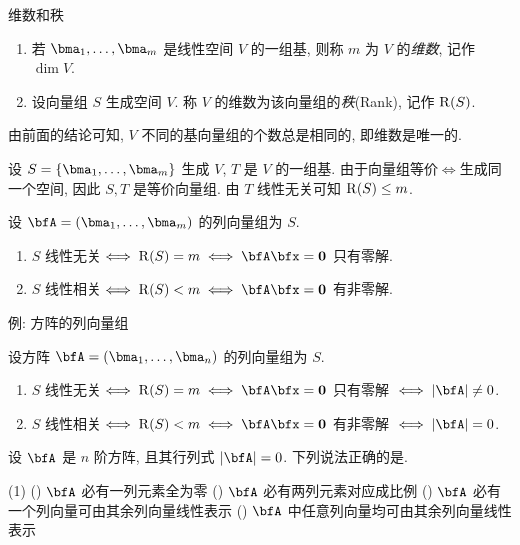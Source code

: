 \begin{frame}{维数和秩}
	\onslide<+->
	\begin{definition}
		\begin{enumerate}
			\item 若 $\bma_1,\dots,\bma_m$ 是线性空间 $V$ 的一组基, 则称 $m$ 为 $V$ 的\emph{维数}, 记作 $\dim V$.
			\item 设向量组 $S$ 生成空间 $V$.
			称 $V$ 的维数为该向量组的\emph{秩}(Rank), 记作 $\operatorname{R}(S)$.
		\end{enumerate}
	\end{definition}
	\onslide<+->
	由前面的结论可知, $V$ 不同的基向量组的个数总是相同的, 即维数是唯一的.

	\onslide<+->
	设 $S=\{\bma_1,\dots,\bma_m\}$ 生成 $V$,
	\onslide<+->
	$T$ 是 $V$ 的一组基.
	\onslide<+->
	由于向量组等价$\iff$生成同一个空间, 因此 $S,T$ 是等价向量组.
	\onslide<+->
	由 $T$ 线性无关可知 $\operatorname{R}(S)\le m$.
	\onslide<+->
	\begin{theorem}
		设 $\bfA=(\bma_1,\dots,\bma_m)$ 的列向量组为 $S$.
		\begin{enumerate}
			\item $S$ 线性无关$\iff \rank(S)=m\iff\bfA\bfx={\bf0}$ 只有零解.
			\item $S$ 线性相关$\iff \rank(S)<m\iff\bfA\bfx={\bf0}$ 有非零解.
		\end{enumerate}
	\end{theorem}
\end{frame}


\begin{frame}{例: 方阵的列向量组}
	\onslide<+->
	\begin{corollary}
		设方阵 $\bfA=(\bma_1,\dots,\bma_n)$ 的列向量组为 $S$.
		\begin{enumerate}
			\item $S$ 线性无关$\iff \rank(S)=m\iff\bfA\bfx={\bf0}$ 只有零解 $\iff |\bfA|\neq0$.
			\item $S$ 线性相关$\iff \rank(S)<m\iff\bfA\bfx={\bf0}$ 有非零解 $\iff |\bfA|=0$.
		\end{enumerate}
	\end{corollary}
	\onslide<+->
	\begin{exercise}
		设 $\bfA$ 是 $n$ 阶方阵, 且其行列式 $|\bfA|=0$. 下列说法正确的是.
		\begin{exchoice}(1)
			() $\bfA$ 必有一列元素全为零
			() $\bfA$ 必有两列元素对应成比例
			() $\bfA$ 必有一个列向量可由其余列向量线性表示
			() $\bfA$ 中任意列向量均可由其余列向量线性表示
		\end{exchoice}
	\end{exercise}
\end{frame}


